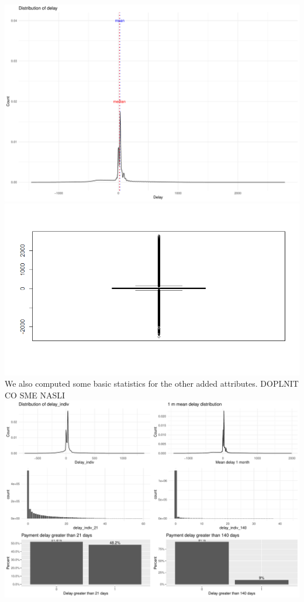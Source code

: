 \documentclass[
]{article}
\begin{document}
\includegraphics{Documentation_Rmarkdown_files/figure-latex/stat_new_delay-4.pdf}
\includegraphics{delay_boxplot.png}
We also computed some basic statistics for the other added attributes. DOPLNIT CO SME NASLI
\includegraphics{Documentation_Rmarkdown_files/figure-latex/stat_new-1.pdf}
\end{document}
